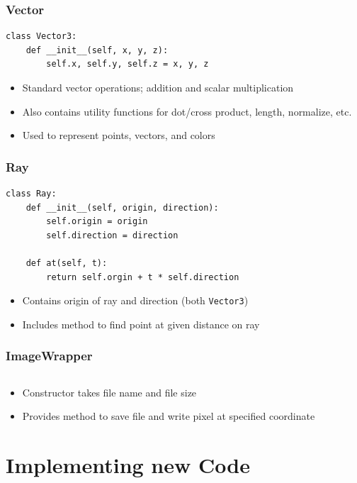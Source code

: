 \documentclass{beamer}
\begin{document}
\begin{frame}[fragile]
	\frametitle{Vector}
	\begin{verbatim}
class Vector3:
    def __init__(self, x, y, z):
        self.x, self.y, self.z = x, y, z
	\end{verbatim}
	\begin{itemize}
		\item Standard vector operations; addition and scalar multiplication
		\item Also contains utility functions for dot/cross product, length, normalize, etc.
		\item Used to represent points, vectors, and colors
	\end{itemize}
\end{frame}

\begin{frame}[fragile]
	\frametitle{Ray}
	\begin{verbatim}
class Ray:
    def __init__(self, origin, direction):
        self.origin = origin
        self.direction = direction
        
    def at(self, t):
        return self.orgin + t * self.direction
\end{verbatim}
	\begin{itemize}
		\item Contains origin of ray and direction (both \texttt{Vector3})
		\item Includes method to find point at given distance on ray
	\end{itemize}
\end{frame}

\begin{frame}
	\frametitle{ImageWrapper}
	\inputminted{python}{scripts/wrapper.py}
	\begin{itemize}
		\item Constructor takes file name and file size
		\item Provides method to save file and write pixel at specified coordinate
	\end{itemize}
\end{frame}

\section{Implementing new Code}
\end{document}
